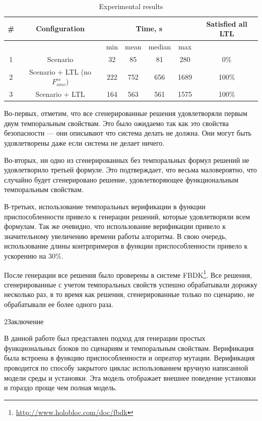 \documentclass[14pt]{extarticle}
\makeatletter
\theoremstyle{plain}
\theoremstyle{definition}
\renewcommand{\subsection}{\@startsection{subsection}{2}{0mm}%
{2\baselineskip}{\baselineskip}{\bfseries\large\itshape}}
\makeatother
\begin{document}
\begin{table}[t]
\centering
\caption{Experimental results}
\label{results-table}
\begin{tabular}{c|c|c|c|c|c|c}
\hline
\# & Configuration & \multicolumn{4}{c|}{Time, s} & Satisfied all LTL\\
\hline
 &              & min & mean & median & max & \\
\hline
1 & Scenario                           & 32       & 85        & 81          & 280  & 0\%\\
2 & Scenario + LTL (no $F_{smv}^{ce}$) & 222      & 752       & 656         & 1689 & 100\%\\   
3 & Scenario + LTL                     & 164      & 563       & 561         & 1575 & 100\%\\
\hline
\end{tabular}
\end{table}

Во-первых, отметим, что все сгенерированные решения удовлетворяли первым двум
темпоральным свойствам. Это было ожидаемо так как это свойства безопасности ---
они описывают что система делать не должна. Они могут быть удовлетворены даже
если система не делает ничего.

Во-вторых, ни одно из сгенерированных без темпоральных формул решений не удовлетворило
третьей формуле. Это подтверждает, что весьма маловероятно, что случайно будет
сгенерировано решение, удовлетворяющее функциональным темпоральным свойствам.

В-третьих, использование темпоральных верификации в функции приспособленности привело
к генерации решений, которые удовлетворяли всем формулам. Так же очевидно, что использование
верификации привело к значительному увеличению времени работы алгоритма. В свою очередь,
использование длины контрпримеров в функции приспособленности привело к ускорению на 30\%.

После генерации все решения было проверены в системе FBDK\footnote{\url{http://www.holobloc.com/doc/fbdk}}.
Все решения, сгенерированные с учетом темпоральных свойств успешно обрабатывали дорожку несколько раз,
в то время как решения, сгенерированные только по сценарию, не обрабатывали ее более одного раза.

\subsection{Заключение}

В данной работе был представлен подход для генерации простых функциональных блоков по
сценариям и темпоральным свойствам. Верификация была встроена в функцию приспособленности и
опреатор мутации. Верификация проводится по способу закрытого циклас использованием
вручную написанной модели среды и установки. Эта модель отображает внешнее поведение
установки и гораздо проще чем полная модель.
\end{document}
